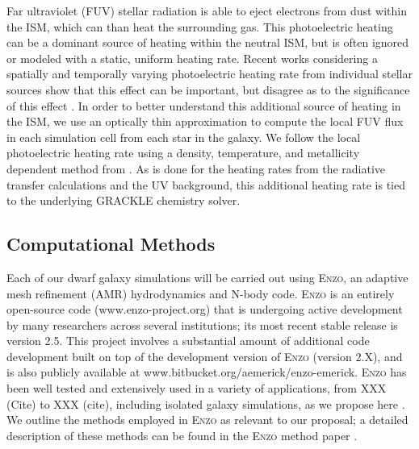 \documentclass[11pt]{article}
\newcommand{\eg}{e.g.,}
\begin{document}
Far ultraviolet (FUV) stellar radiation is able to eject electrons from dust within the ISM, which can than heat the surrounding gas. This photoelectric heating can be a dominant source of heating within the neutral ISM, but is often ignored or modeled with a static, uniform heating rate. Recent works considering a spatially and temporally varying photoelectric heating rate from individual stellar sources show that this effect can be important, but disagree as to the significance of this effect \citep{Hu2016, Forbes2016}. In order to better understand this additional source of heating in the ISM, we use an optically thin approximation to compute the local FUV flux in each simulation cell from each star in the galaxy. We follow the local photoelectric heating rate using a density, temperature, and metallicity dependent method from \cite{BakesTielens1994, Wolfire2003}. As is done for the heating rates from the radiative transfer calculations and the UV background, this additional heating rate is tied to the underlying \textsc{GRACKLE} chemistry solver.

\subsection{Computational Methods}

Each of our dwarf galaxy simulations will be carried out using \textsc{Enzo}, an adaptive mesh refinement (AMR) hydrodynamics and N-body code. \textsc{Enzo} is an entirely open-source code (www.enzo-project.org) that is undergoing active development by many researchers across several institutions; its most recent stable release is version 2.5. This project involves a substantial amount of additional code development built on top of the development version of \textsc{Enzo} (version 2.X), and is also publicly available at www.bitbucket.org/aemerick/enzo-emerick. \textsc{Enzo} has been well tested and extensively used in a variety of applications, from XXX (Cite) to XXX (cite), including isolated galaxy simulations, as we propose here \citep[\eg][]{Goldbaum2015, Goldbaum2016, Forbes2016}. We outline the methods employed in \textsc{Enzo} as relevant to our proposal; a detailed description of these methods can be found in the \textsc{Enzo} method paper \citep{Enzo2014}. 
\end{document}
